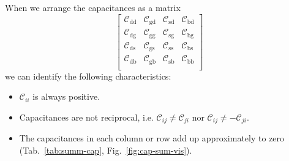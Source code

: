 \documentclass{article}[11pt]
\begin{document}
\medskip

When we arrange the capacitances as a matrix
\begin{equation}
\begin{bmatrix}
\mathcal{C}_{\mathrm{dd}} & \mathcal{C}_{\mathrm{gd}} & \mathcal{C}_{\mathrm{sd}} & \mathcal{C}_{\mathrm{bd}} \\
\mathcal{C}_{\mathrm{dg}} & \mathcal{C}_{\mathrm{gg}} & \mathcal{C}_{\mathrm{sg}} & \mathcal{C}_{\mathrm{bg}} \\
\mathcal{C}_{\mathrm{ds}} & \mathcal{C}_{\mathrm{gs}} & \mathcal{C}_{\mathrm{ss}} & \mathcal{C}_{\mathrm{bs}} \\
\mathcal{C}_{\mathrm{db}} & \mathcal{C}_{\mathrm{gb}} & \mathcal{C}_{\mathrm{sb}} & \mathcal{C}_{\mathrm{bb}} \\
\end{bmatrix}
\end{equation}
we can identify the following characteristics:
\begin{itemize}
  \item $\mathcal{C}_{ii}$ is always positive.
  \item Capacitances are not reciprocal, i.e. $\mathcal{C}_{ij}\neq\mathcal{C}_{ji}$
    nor $\mathcal{C}_{ij}\neq-\mathcal{C}_{ji}$.
  \item The capacitances in each column or row add up approximately to zero 
    (Tab.~\ref{tab:summ-cap}, Fig.~\ref{fig:cap-sum-vis}).
\end{itemize}
\end{document}
